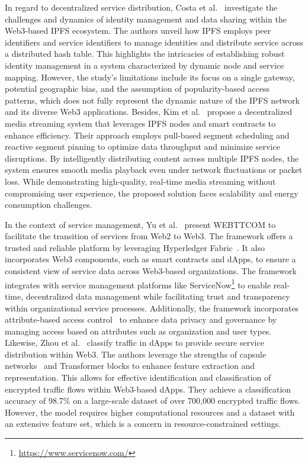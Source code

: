 \documentclass[5p,twocolumn]{elsarticle}
\begin{document}
In regard to decentralized service distribution, Costa et al.~\cite{costa2023studying} investigate the challenges and dynamics of identity management and data sharing within the Web3-based IPFS ecosystem. The authors unveil how IPFS employs peer identifiers and service identifiers to manage identities and distribute service across a distributed hash table. This highlights the intricacies of establishing robust identity management in a system characterized by dynamic node and service mapping. However, the study's limitations include its focus on a single gateway, potential geographic bias, and the assumption of popularity-based access patterns, which does not fully represent the dynamic nature of the IPFS network and its diverse Web3 applications.
%
Besides, Kim et al.~\cite{kim2023moving} propose a decentralized media streaming system that leverages IPFS nodes and smart contracts to enhance efficiency. Their approach employs pull-based segment scheduling and reactive segment pinning to optimize data throughput and minimize service disruptions. By intelligently distributing content across multiple IPFS nodes, the system ensures smooth media playback even under network fluctuations or packet loss. While demonstrating high-quality, real-time media streaming without compromising user experience, the proposed solution faces scalability and energy consumption challenges.

In the context of service management, Yu et al.~\cite{yu2024web3} present WEBTTCOM to facilitate the transition of services from Web2 to Web3. The framework offers a trusted and reliable platform by leveraging Hyperledger Fabric~\cite{androulaki2018hyperledger}. It also incorporates Web3 components, such as smart contracts and dApps, to ensure a consistent view of service data across Web3-based organizations. The framework integrates with service management platforms like ServiceNow\footnote{\url{https://www.servicenow.com/}} to enable real-time, decentralized data management while facilitating trust and transparency within organizational service processes. Additionally, the framework incorporates attribute-based access control~\cite{servos2017current} to enhance data privacy and governance by managing access based on attributes such as organization and user types.
%
Likewise, Zhou et al.~\cite{zhou2024capsuleformer} classify traffic in dApps to provide secure service distribution within Web3. The authors leverage the strengths of capsule networks~\cite{patrick2022capsule} and Transformer blocks to enhance feature extraction and representation. This allows for effective identification and classification of encrypted traffic flows within Web3-based dApps. They achieve a classification accuracy of 98.7\% on a large-scale dataset of over 700,000 encrypted traffic flows. However, the model requires higher computational resources and a dataset with an extensive feature set, which is a concern in resource-constrained settings.
\end{document}
